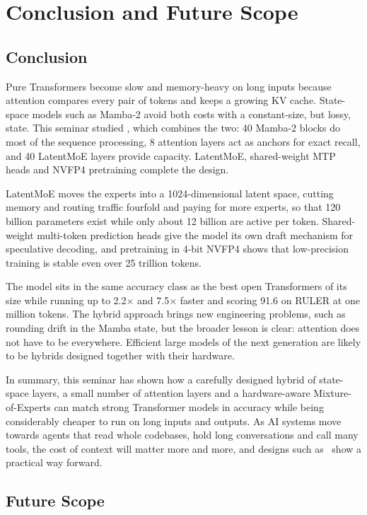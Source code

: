 \chapter{Conclusion and Future Scope}
\label{ch:conclusion}

\section{Conclusion}

Pure Transformers become slow and memory-heavy on long inputs because
attention compares every pair of tokens and keeps a growing KV cache.
State-space models such as Mamba-2 avoid both costs with a constant-size, but
lossy, state. This seminar studied \NS, which combines the two: 40 Mamba-2
blocks do most of the sequence processing, 8 attention layers act as anchors
for exact recall, and 40 LatentMoE layers provide capacity. LatentMoE,
shared-weight MTP heads and NVFP4 pretraining complete the design.

LatentMoE moves the experts into a 1024-dimensional latent space, cutting
memory and routing traffic fourfold and paying for more experts, so that 120
billion parameters exist while only about 12 billion are active per token.
Shared-weight multi-token prediction heads give the model its own draft
mechanism for speculative decoding, and pretraining in 4-bit NVFP4 shows that
low-precision training is stable even over 25 trillion tokens.

The model sits in the same accuracy class as the best open Transformers of its
size while running up to 2.2$\times$ and 7.5$\times$ faster and scoring 91.6 on
RULER at one million tokens. The hybrid approach brings new engineering
problems, such as rounding drift in the Mamba state, but the broader lesson is
clear: attention does not have to be everywhere. Efficient large models of the
next generation are likely to be hybrids designed together with their
hardware.

In summary, this seminar has shown how a carefully designed hybrid of
state-space layers, a small number of attention layers and a hardware-aware
Mixture-of-Experts can match strong Transformer models in accuracy while being
considerably cheaper to run on long inputs and outputs. As AI systems move
towards agents that read whole codebases, hold long conversations and call
many tools, the cost of context will matter more and more, and designs such as
\NS\ show a practical way forward.

\section{Future Scope}

